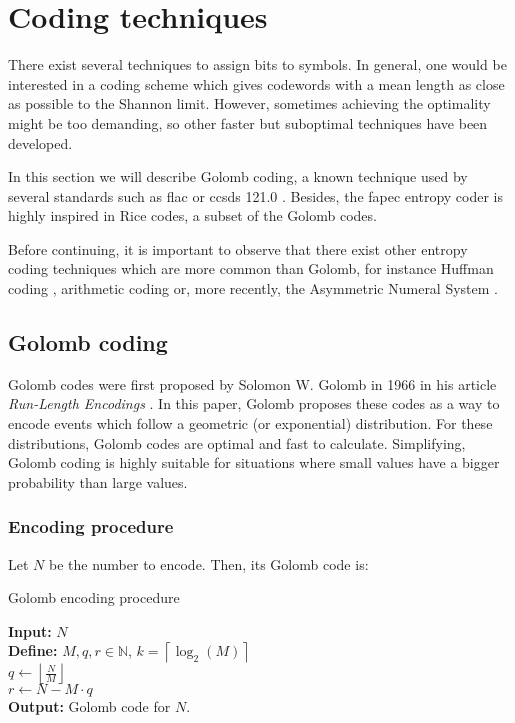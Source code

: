\section{Coding techniques}
There exist several techniques to assign bits to symbols. In general, one would be interested in a coding scheme which gives codewords with a mean length as close as possible to the Shannon limit. However, sometimes achieving the optimality might be too demanding, so other faster but suboptimal techniques have been developed.

In this section we will describe Golomb coding, a known technique used by several standards such as \acrshort{flac} \parencite{FLAC} or \acrshort{ccsds} 121.0 \parencite{ccsds121}. Besides, the \acrshort{fapec} entropy coder is highly inspired in Rice codes, a subset of the Golomb codes.

Before continuing, it is important to observe that there exist other entropy coding techniques which are more common than Golomb, for instance Huffman coding \parencite{cover}, arithmetic coding \parencite{MacKay} or, more recently, the Asymmetric Numeral System \parencite{ans}.

\subsection{Golomb coding} \label{golomb-coding}
Golomb codes were first proposed by Solomon W. Golomb in 1966 in his article \textit{Run-Length Encodings} \parencite{Golomb1966}. In this paper, Golomb proposes these codes as a way to encode events which follow a geometric (or exponential) distribution. For these distributions, Golomb codes are optimal \parencite{OptimalRice} \parencite{OptimalGeometric} and fast to calculate. Simplifying, Golomb coding is highly suitable for situations where small values have a bigger probability than large values.

\subsubsection{Encoding procedure}
Let $N$ be the number to encode. Then, its Golomb code is:

\begin{algorithm}[H]
	\caption{Golomb encoding procedure}
	\SetAlgoLined
	\textbf{Input:} $N$\\
	\textbf{Define:} $M,q,r \in \mathbb{N}$, \quad $k = \left\lceil \log_2(M) \right\rceil$\\
	$q \gets \left\lfloor \frac{N}{M} \right\rfloor$\\
	$r \gets N - M \cdot q$\\
	\textbf{Output:} Golomb code for $N$.
\end{algorithm}

